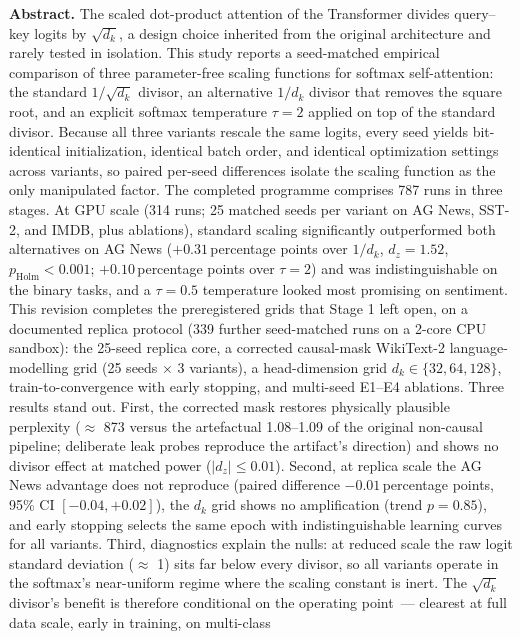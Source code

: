\documentclass[11pt,a4paper]{article}
\newcommand{\dk}{d_k}
\newcommand{\pp}{percentage points}
\begin{document}
\noindent\textbf{Abstract.}
The scaled dot-product attention of the Transformer divides query--key logits by
$\sqrt{\dk}$, a design choice inherited from the original architecture and rarely
tested in isolation. This study reports a seed-matched empirical comparison of three
parameter-free scaling functions for softmax self-attention: the standard
$1/\sqrt{\dk}$ divisor, an alternative $1/\dk$ divisor that removes the square root,
and an explicit softmax temperature $\tau = 2$ applied on top of the standard
divisor. Because all three variants rescale the same logits, every seed yields
bit-identical initialization, identical batch order, and identical optimization
settings across variants, so paired per-seed differences isolate the scaling
function as the only manipulated factor. The completed programme comprises 787
runs in three stages. At GPU scale (314 runs; 25 matched seeds per variant on
AG News, SST-2, and IMDB, plus ablations), standard scaling significantly
outperformed both alternatives on AG News ($+0.31$\,\pp{} over $1/\dk$,
$d_z = 1.52$, $p_{\text{Holm}} < 0.001$; $+0.10$\,\pp{} over $\tau=2$) and was
indistinguishable on the binary tasks, and a $\tau = 0.5$ temperature looked
most promising on sentiment. This revision completes the preregistered grids
that Stage 1 left open, on a documented replica protocol (339 further
seed-matched runs on a 2-core CPU sandbox): the 25-seed replica core, a
corrected causal-mask WikiText-2 language-modelling grid (25 seeds $\times$ 3
variants), a head-dimension grid $\dk \in \{32, 64, 128\}$,
train-to-convergence with early stopping, and multi-seed E1--E4 ablations.
Three results stand out. First, the corrected mask restores physically
plausible perplexity ($\approx$ 873 versus the artefactual 1.08--1.09 of the
original non-causal pipeline; deliberate leak probes reproduce the artifact's
direction) and shows no divisor effect at matched power ($|d_z| \le 0.01$).
Second, at replica scale the AG News advantage does not reproduce (paired
difference $-0.01$\,\pp, 95\% CI $[-0.04, +0.02]$), the $\dk$ grid shows no
amplification (trend $p = 0.85$), and early stopping selects the same epoch
with indistinguishable learning curves for all variants. Third, diagnostics
explain the nulls: at reduced scale the raw logit standard deviation
($\approx$ 1) sits far below every divisor, so all variants operate in the
softmax's near-uniform regime where the scaling constant is inert. The
$\sqrt{\dk}$ divisor's benefit is therefore conditional on the operating
point~--- clearest at full data scale, early in training, on multi-class
\end{document}
